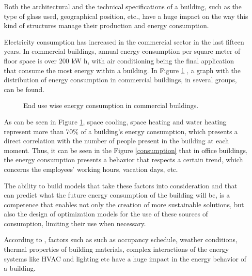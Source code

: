 Both the architectural and the technical specifications of a building, such as the type of glass used, geographical position, etc., have a huge impact on the way this kind of structures manage their production and energy consumption. 

Electricity consumption has increased in the commercial sector in the last fifteen years.  In commercial buildings, annual energy consumption per square meter of floor space is over 200 kW h, with air conditioning being the final application that consume the most energy within a building\cite{pie_1}. In Figure \ref{buildingenergy} \cite{pie_1}, a graph with the distribution of energy consumption in commercial buildings, in several groups, can be found.


\begin{figure}[h!]
    \centering
    \begin{center}
    \caption{End use wise energy consumption in commercial buildings.}
    \label{buildingenergy}
    \end{center}
\end{figure}


As can be seen in Figure \ref{buildingenergy}, space cooling, space heating and water heating represent more than 70\% of a building's energy consumption, which presents a direct correlation with  the number of people present in the building at each moment. Thus, it can be seen in the Figure \ref{consumption} that in office buildings, the energy consumption presents a behavior that respects a certain trend, which concerns the employees' working hours, vacation days, etc.

The ability to build models that take these factors into consideration and that can predict what the future energy consumption of the building will be, is a competence that enables not only the creation of more sustainable solutions, but also the design of optimization models for the use of these sources of consumption, limiting their use when necessary.

According to \cite{reviewtsf}, factors such as such as occupancy schedule, weather conditions, thermal properties of building materials, complex interactions of the energy systems like \ac{HVAC} and lighting etc have a huge impact in the energy behavior of a building. 


